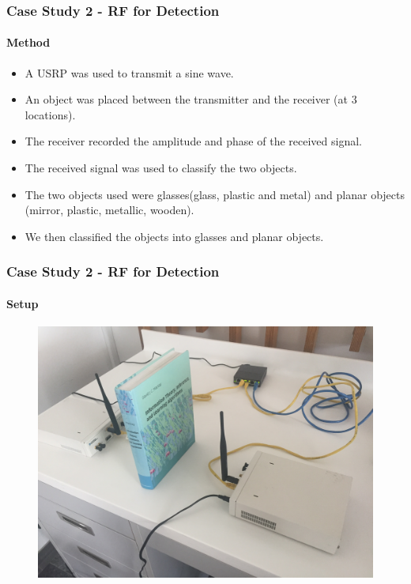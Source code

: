 \documentclass{beamer}
\begin{document}
\begin{frame}
    \frametitle{Case Study 2 - RF for Detection}
    \framesubtitle{Method}
    
    \begin{itemize}
    \item A USRP was used to transmit a sine wave. 
    \item An object was placed between the transmitter and the receiver (at 3 locations). 
    \item The receiver recorded the amplitude and phase of the received signal. 
    \item The received signal was used to classify the two objects. 
    \item The two objects used were glasses(glass, plastic and metal) and planar objects (mirror, plastic, metallic, wooden).
    \item We then classified the objects into glasses and planar objects. 
    \end{itemize}
\end{frame}

\begin{frame}
    \frametitle{Case Study 2 - RF for Detection}
    \framesubtitle{Setup}
    \begin{figure}
        \centering
        \includegraphics[width=0.8\paperwidth]{./images/usrp2.JPG}
    \end{figure}
\end{frame}
\end{document}
